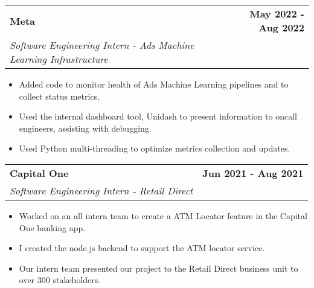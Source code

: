 \documentclass[11pt]{extreport}
\makeatletter
\newcommand{\resumeSubheading}[4]{
  \vspace{-1pt}
    \begin{tabular*}{1.0\textwidth}{l@{\extracolsep{\fill}}r}
      \textbf{#1} & \textbf{#2}  \vspace{1mm} \\
      {#3} & \textbf{#4} \\
    \end{tabular*}\vspace{-3pt}
}
\makeatother
\begin{document}
\resumeSubheading{Meta}{May 2022 - Aug 2022}
    {\textit{Software Engineering Intern - Ads Machine Learning Infrastructure}}{}
    \vspace{-2mm}
    \begin{itemize}
     \item[\textperiodcentered] Added code to monitor health of Ads Machine Learning pipelines and to collect status metrics.
     \vspace{-2mm}
     \item[\textperiodcentered] Used the internal dashboard tool, Unidash to present information to oncall engineers, assisting with debugging.
     \vspace{-2mm}
     \item[\textperiodcentered] Used Python multi-threading to optimize metrics collection and updates.
    \end{itemize}
    
    \resumeSubheading{Capital One}{Jun 2021 - Aug 2021}
    {\textit{Software Engineering Intern - Retail Direct}}{}
    \vspace{-2mm}
    \begin{itemize}
    \item[\textperiodcentered] Worked on an all intern team to create a ATM Locator feature in the Capital One banking app.
            \vspace{-2mm}

        \item[\textperiodcentered] I created the node.js backend to support the ATM locator service.
                \vspace{-2mm}

        \item[\textperiodcentered] Our intern team presented our project to the Retail Direct business unit to over 300 stakeholders.
    \end{itemize}
    
\end{document}
